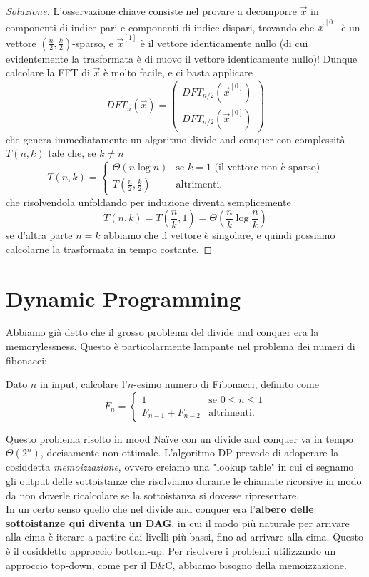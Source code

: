 \documentclass[11pt]{scrartcl}
\newcommand{\bigtheta}[1]{\Theta\!\left(#1\right)}
\begin{document}
	\begin{proof}[Soluzione]
		L'osservazione chiave consiste nel provare a decomporre $\vec{x}$ in componenti di indice pari e componenti di indice dispari, trovando che $\vec{x}^{[0]}$ è un vettore $\left(\frac{n}{2},\frac{k}{2}\right)$-sparso, e $\vec{x}^{[1]}$ è il vettore identicamente nullo (di cui evidentemente la trasformata è di nuovo il vettore identicamente nullo)! Dunque calcolare la FFT di $\vec{x}$ è molto facile, e ci basta applicare
		$$DFT_n(\vec{x})=
		\begin{pmatrix}
			DFT_{n/2}(\vec{x}^{[0]}) \\
			DFT_{n/2}(\vec{x}^{[0]})
		\end{pmatrix}
		$$
		che genera immediatamente un algoritmo divide and conquer con complessità $T(n,k)$ tale che, se $k\ne n$
		$$T(n,k)=
		\begin{cases}
			\bigtheta{n\log n} & \text{se $k=1$ (il vettore non è sparso)} \\
			T\left(\frac{n}{2},\frac{k}{2}\right) & \text{altrimenti.}
		\end{cases}
		$$	
		che risolvendola unfoldando per induzione diventa semplicemente
		$$T(n,k)=T\left(\frac{n}{k},1\right)=\bigtheta{\frac{n}{k}\log\frac{n}{k}}$$
		se d'altra parte $n=k$ abbiamo che il vettore è singolare, e quindi possiamo calcolarne la trasformata in tempo costante.
	\end{proof}
	
	\newpage
	
	\section{Dynamic Programming}
	Abbiamo già detto che il grosso problema del divide and conquer era la memorylessness. Questo è particolarmente lampante nel problema dei numeri di fibonacci:
	\begin{example}
		Dato $n$ in input, calcolare l'$n$-esimo numero di Fibonacci, definito come
		$$
		F_n=
		\begin{cases}
			1 & \text{se $0\le n\le 1$} \\
			F_{n-1}+F_{n-2} & \text{altrimenti.}
		\end{cases}
		$$
	\end{example}
	Questo problema risolto in mood Na{\"i}ve con un divide and conquer va in tempo $\bigtheta{2^n}$, decisamente non ottimale. L'algoritmo DP prevede di adoperare la cosiddetta \textit{memoizzazione}, ovvero creiamo una "lookup table" in cui ci segnamo gli output delle sottoistanze che risolviamo durante le chiamate ricorsive in modo da non doverle ricalcolare se la sottoistanza si dovesse ripresentare. \\
	In un certo senso quello che nel divide and conquer era l'\textbf{albero delle sottoistanze qui diventa un DAG}, in cui il modo più naturale per arrivare alla cima è iterare a partire dai livelli più bassi, fino ad arrivare alla cima. Questo è il cosiddetto approccio bottom-up. Per risolvere i problemi utilizzando un approccio top-down, come per il D\&C, abbiamo bisogno della memoizzazione.
	
\end{document}
